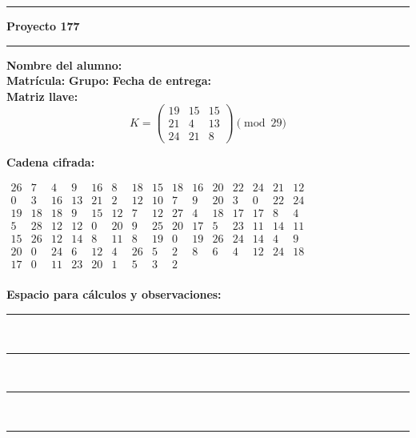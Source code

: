 \documentclass{article}%
\begin{document}
\bigskip
\hrule
\bigskip%

\textbf{Proyecto 177}\\[2pt]
\hrule
\bigskip

\textbf{Nombre del alumno:} \underline{\hspace{8cm}}\\[8pt]
\textbf{Matrícula:} \underline{\hspace{4cm}} \hspace{1cm}
\textbf{Grupo:} \underline{\hspace{2cm}} \hspace{1cm}
\textbf{Fecha de entrega:} \underline{\hspace{2.5cm}}\\[12pt]

\textbf{Matriz llave:}
\[
K = \begin{pmatrix}
19 & 15 & 15 \\
21 & 4 & 13 \\
24 & 21 & 8
\end{pmatrix} \pmod{29}
\]

\textbf{Cadena cifrada:}
\begin{center}
$\begin{array}{lllllllllllllll}
26 & 7 & 4 & 9 & 16 & 8 & 18 & 15 & 18 & 16 & 20 & 22 & 24 & 21 & 12\\
0 & 3 & 16 & 13 & 21 & 2 & 12 & 10 & 7 & 9 & 20 & 3 & 0 & 22 & 24\\
19 & 18 & 18 & 9 & 15 & 12 & 7 & 12 & 27 & 4 & 18 & 17 & 17 & 8 & 4\\
5 & 28 & 12 & 12 & 0 & 20 & 9 & 25 & 20 & 17 & 5 & 23 & 11 & 14 & 11\\
15 & 26 & 12 & 14 & 8 & 11 & 8 & 19 & 0 & 19 & 26 & 24 & 14 & 4 & 9\\
20 & 0 & 24 & 6 & 12 & 4 & 26 & 5 & 2 & 8 & 6 & 4 & 12 & 24 & 18\\
17 & 0 & 11 & 23 & 20 & 1 & 5 & 3 & 2\\
\end{array}$
\end{center}

\bigskip
\textbf{Espacio para cálculos y observaciones:}\\[6pt]
\rule{\linewidth}{0.4pt}\\[10pt]
\rule{\linewidth}{0.4pt}\\[10pt]
\rule{\linewidth}{0.4pt}\\[10pt]
\rule{\linewidth}{0.4pt}\\[10pt]
%
\end{document}
